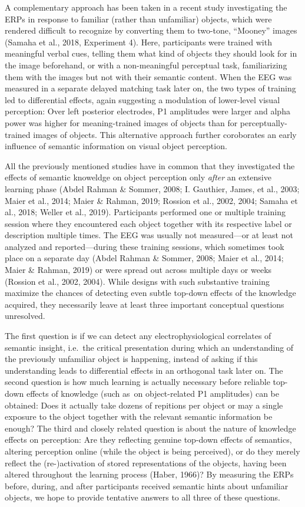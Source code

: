 \documentclass[
  english,
  man,11pt,floatsintext]{apa7}
\begin{document}
A complementary approach has been taken in a recent study investigating the ERPs in response to familiar (rather than unfamiliar) objects, which were rendered difficult to recognize by converting them to two-tone, \enquote{Mooney} images (Samaha et al., 2018, Experiment 4). Here, participants were trained with meaningful verbal cues, telling them what kind of objects they should look for in the image beforehand, or with a non-meaningful perceptual task, familiarizing them with the images but not with their semantic content. When the EEG was measured in a separate delayed matching task later on, the two types of training led to differential effects, again suggesting a modulation of lower-level visual perception: Over left posterior electrodes, P1 amplitudes were larger and alpha power was higher for meaning-trained images of objects than for perceptually-trained images of objects. This alternative approach further coroborates an early influence of semantic information on visual object perception.

All the previously mentioned studies have in common that they investigated the effects of semantic knoweldge on object perception only \emph{after} an extensive learning phase (Abdel Rahman \& Sommer, 2008; I. Gauthier, James, et al., 2003; Maier et al., 2014; Maier \& Rahman, 2019; Rossion et al., 2002, 2004; Samaha et al., 2018; Weller et al., 2019). Participants performed one or multiple training session where they encountered each object together with its respective label or description multiple times. The EEG was usually not measured---or at least not analyzed and reported---during these training sessions, which sometimes took place on a separate day (Abdel Rahman \& Sommer, 2008; Maier et al., 2014; Maier \& Rahman, 2019) or were spread out across multiple days or weeks (Rossion et al., 2002, 2004). While designs with such substantive training maximize the chances of detecting even subtle top-down effects of the knowledge acquired, they necessarily leave at least three important conceptual questions unresolved.

The first question is if we can detect any electrophysiological correlates of semantic insight, i.e.~the critical presentation during which an understanding of the previously unfamiliar object is happening, instead of asking if this understanding leads to differential effects in an orthogonal task later on. The second question is how much learning is actually necessary before reliable top-down effects of knowledge (such as~on object-related P1 amplitudes) can be obtained: Does it actually take dozens of repitions per object or may a single exposure to the object together with the relevant semantic information be enough? The third and closely related question is about the nature of knowledge effects on perception: Are they reflecting genuine top-down effects of semantics, altering perception online (while the object is being perceived), or do they merely reflect the (re-)activation of stored representations of the objects, having been altered throughout the learning process (Haber, 1966)? By measuring the ERPs before, during, and after participants received semantic hints about unfamiliar objects, we hope to provide tentative answers to all three of these questions.
\end{document}
